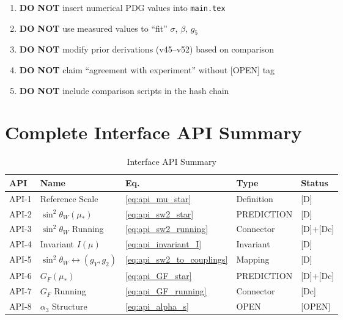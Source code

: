 \documentclass[11pt,a4paper]{article}
\theoremstyle{definition}
\begin{document}
\begin{firewallbox}
\begin{enumerate}
\item \textbf{DO NOT} insert numerical PDG values into \texttt{main.tex}
\item \textbf{DO NOT} use measured values to ``fit'' $\sigma$, $\beta$, $g_5$
\item \textbf{DO NOT} modify prior derivations (v45--v52) based on comparison
\item \textbf{DO NOT} claim ``agreement with experiment'' without [OPEN] tag
\item \textbf{DO NOT} include comparison scripts in the hash chain
\end{enumerate}
\end{firewallbox}

\section{Complete Interface API Summary}
\label{sec:api_summary}

\begin{table}[h]
\centering
\caption{Interface API Summary}
\label{tab:api_summary}
\begin{tabular}{@{}lllll@{}}
\toprule
\textbf{API} & \textbf{Name} & \textbf{Eq.} & \textbf{Type} & \textbf{Status} \\
\midrule
API-1 & Reference Scale & \ref{eq:api_mu_star} & Definition & [D] \\
API-2 & $\sin^2\theta_W(\mu_*)$ & \ref{eq:api_sw2_star} & PREDICTION & [D] \\
API-3 & $\sin^2\theta_W$ Running & \ref{eq:api_sw2_running} & Connector & [D]+[Dc] \\
API-4 & Invariant $I(\mu)$ & \ref{eq:api_invariant_I} & Invariant & [D] \\
API-5 & $\sin^2\theta_W \leftrightarrow (g_Y, g_2)$ & \ref{eq:api_sw2_to_couplings} & Mapping & [D] \\
API-6 & $G_F(\mu_*)$ & \ref{eq:api_GF_star} & PREDICTION & [D]+[Dc] \\
API-7 & $G_F$ Running & \ref{eq:api_GF_running} & Connector & [Dc] \\
API-8 & $\alpha_3$ Structure & \ref{eq:api_alpha_s} & OPEN & [OPEN] \\
\bottomrule
\end{tabular}
\end{table}
\end{document}
